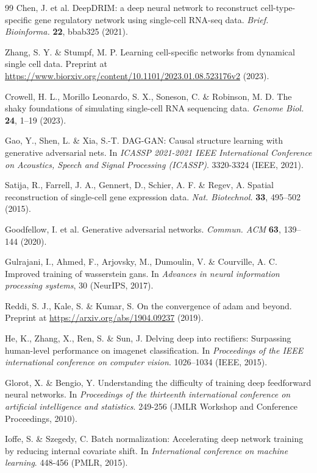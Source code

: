 \begin{singlespace}
\begin{thebibliography}{99\kern\bibindent}
Chen, J. et al. DeepDRIM: a deep neural network to reconstruct cell-type-specific gene regulatory network using single-cell RNA-seq
data. \textit{Brief. Bioinforma.} \textbf{22}, bbab325 (2021).

Zhang, S. Y. \& Stumpf, M. P. Learning cell-specific networks from
dynamical single cell data. Preprint at \href{https://www.biorxiv.org/content/10.1101/2023.01.08.523176v2}{https://www.biorxiv.org/content/10.1101/2023.01.08.523176v2} (2023).

Crowell, H. L., Morillo Leonardo, S. X., Soneson, C. \& Robinson, M.
D. The shaky foundations of simulating single-cell RNA sequencing
data. \textit{Genome Biol.} \textbf{24}, 1–19 (2023).

Gao, Y., Shen, L. \& Xia, S.-T. DAG-GAN: Causal structure learning with generative adversarial nets. In \textit{ICASSP 2021-2021 IEEE International Conference on Acoustics, Speech and Signal Processing (ICASSP)}. 3320-3324 (IEEE, 2021).

Satija, R., Farrell, J. A., Gennert, D., Schier, A. F. \& Regev, A. Spatial
reconstruction of single-cell gene expression data. \textit{Nat. Biotechnol.} \textbf{33}, 495–502 (2015).

Goodfellow, I. et al. Generative adversarial networks. \textit{Commun. ACM} \textbf{63}, 139–144 (2020).

Gulrajani, I., Ahmed, F., Arjovsky, M., Dumoulin, V. \& Courville, A. C.
Improved training of wasserstein gans. In \textit{Advances in neural information processing systems}, 30 (NeurIPS, 2017).

Reddi, S. J., Kale, S. \& Kumar, S. On the convergence of adam and
beyond. Preprint at \href{https://arxiv.org/abs/1904.09237}{https://arxiv.org/abs/1904.09237} (2019).

He, K., Zhang, X., Ren, S. \& Sun, J. Delving deep into rectifiers:
Surpassing human-level performance on imagenet classification. In
\textit{Proceedings of the IEEE international conference on computer
vision}. 1026–1034 (IEEE, 2015).

Glorot, X. \& Bengio, Y. Understanding the difficulty of training deep
feedforward neural networks. In \textit{Proceedings of the thirteenth
international conference on artificial intelligence and statistics}. 249-256 (JMLR Workshop and Conference Proceedings, 2010).

Ioffe, S. \& Szegedy, C. Batch normalization: Accelerating deep
network training by reducing internal covariate shift. In \textit{International
conference on machine learning}. 448-456 (PMLR, 2015).


\end{thebibliography}
\end{singlespace}
